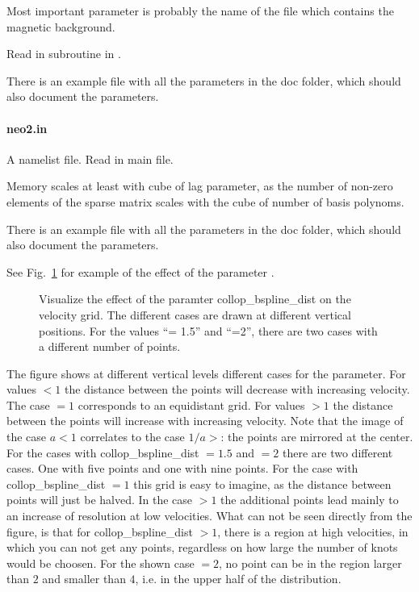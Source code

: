 Most important parameter is probably the name of the file which contains
the magnetic background.

Read in subroutine  in
.

There is an example file with all the parameters in the doc folder,
which should also document the parameters.

\paragraph{neo2.in}
A namelist file.
Read in main file.

Memory scales at least with cube of lag parameter, as the number of
non-zero elements of the sparse matrix scales with the cube of number of
basis polynoms.

There is an example file with all the parameters in the doc folder,
which should also document the parameters.

See Fig.~\ref{fig:collop_bspline_dist} for example of the effect of the
parameter .

\begin{figure}
  \centering{}
  \caption{Visualize the effect of the paramter collop\_bspline\_dist on
  the velocity grid. The different cases are drawn at different vertical
  positions. For the values ``= 1.5'' and ``=2'', there are two cases with
  a different number of points.}
  \label{fig:collop_bspline_dist}
\end{figure}
The figure shows at different vertical levels different cases for the
parameter.
For values $< 1$ the distance between the points will decrease with
increasing velocity. The case $= 1$ corresponds to an equidistant grid.
For values $> 1$ the distance between the points will increase with
increasing velocity.
Note that the image of the case $a < 1$ correlates to the case $1/a > $:
the points are mirrored at the center.
For the cases with collop\_bspline\_dist $=1.5$ and $=2$ there are two
different cases. One with five points and one with nine points. For the
case with collop\_bspline\_dist $=1$ this grid is easy to imagine, as
the distance between points will just be halved.
In the case $> 1$ the additional points lead mainly to an increase of
resolution at low velocities.
What can not be seen directly from the figure, is that for
collop\_bspline\_dist $> 1$, there is a region at high velocities, in
which you can not get any points, regardless on how large the number of
knots would be choosen. For the shown case $=2$, no point can be in the
region larger than $2$ and smaller than $4$, i.e. in the upper half of
the distribution.

